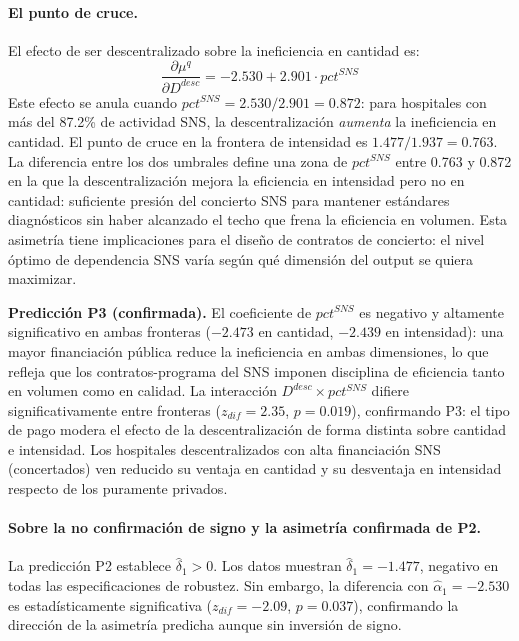\paragraph{El punto de cruce.} El efecto de ser descentralizado sobre la ineficiencia en cantidad es:
\begin{equation}
  \frac{\partial \mu^q}{\partial D^{desc}} =
  -2.530 + 2.901 \cdot pct^{SNS}
  \label{eq:ddesc_dq}
\end{equation}
Este efecto se anula cuando $pct^{SNS} = 2.530/2.901 = 0.872$: para hospitales con más del 87.2\% de actividad SNS, la descentralización \textit{aumenta} la ineficiencia en cantidad. El punto de cruce en la frontera de intensidad es $1.477/1.937 = 0.763$. La diferencia entre los dos umbrales define una zona de $pct^{SNS}$ entre 0.763 y 0.872 en la que la descentralización mejora la eficiencia en intensidad pero no en cantidad: suficiente presión del concierto SNS para mantener estándares diagnósticos sin haber alcanzado el techo que frena la eficiencia en volumen. Esta asimetría tiene implicaciones para el diseño de contratos de concierto: el nivel óptimo de dependencia SNS varía según qué dimensión del output se quiera maximizar.

\textbf{Predicción P3 (confirmada).} El coeficiente de $pct^{SNS}$ es negativo y altamente significativo en ambas fronteras ($-2.473$ en cantidad, $-2.439$ en intensidad): una mayor financiación pública reduce la ineficiencia en ambas dimensiones, lo que refleja que los contratos-programa del SNS imponen disciplina de eficiencia tanto en volumen como en calidad. La interacción $D^{desc}\times pct^{SNS}$ difiere significativamente entre fronteras ($z_{dif}=2.35$, $p=0.019$), confirmando P3: el tipo de pago modera el efecto de la descentralización de forma distinta sobre cantidad e intensidad. Los hospitales descentralizados con alta financiación SNS (concertados) ven reducido su ventaja en cantidad y su desventaja en intensidad respecto de los puramente privados.

\paragraph{Sobre la no confirmación de signo y la asimetría confirmada de P2.}
La predicción P2 establece $\hat{\delta}_1 > 0$. Los datos muestran $\hat{\delta}_1 = -1.477$, negativo en todas las especificaciones de robustez. Sin embargo, la diferencia con $\hat{\alpha}_1 = -2.530$ es estadísticamente significativa ($z_{dif}=-2.09$, $p=0.037$), confirmando la dirección de la asimetría predicha aunque sin inversión de signo.

